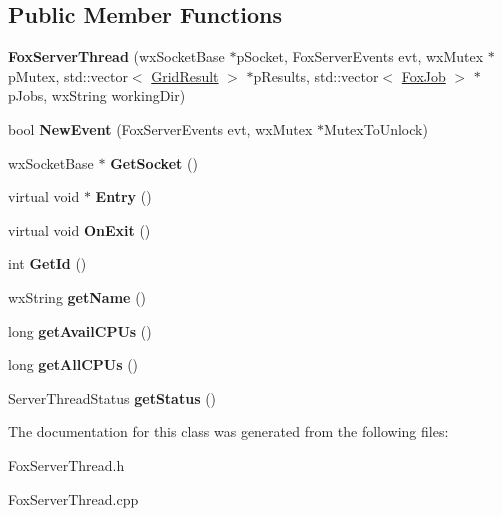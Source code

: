 \subsection*{Public Member Functions}
\begin{DoxyCompactItemize}
\item 
\mbox{\label{class_fox_server_thread_a2f5dd9031e5365799fbc0148aaf4924a}} 
{\bfseries Fox\+Server\+Thread} (wx\+Socket\+Base $\ast$p\+Socket, Fox\+Server\+Events evt, wx\+Mutex $\ast$p\+Mutex, std\+::vector$<$ \mbox{\hyperlink{class_grid_result}{Grid\+Result}} $>$ $\ast$p\+Results, std\+::vector$<$ \mbox{\hyperlink{class_fox_job}{Fox\+Job}} $>$ $\ast$p\+Jobs, wx\+String working\+Dir)
\item 
\mbox{\label{class_fox_server_thread_a75f635286768973b908cc084d428f711}} 
bool {\bfseries New\+Event} (Fox\+Server\+Events evt, wx\+Mutex $\ast$Mutex\+To\+Unlock)
\item 
\mbox{\label{class_fox_server_thread_a57cf46c3bce5b7211c999fdda939127a}} 
wx\+Socket\+Base $\ast$ {\bfseries Get\+Socket} ()
\item 
\mbox{\label{class_fox_server_thread_a2e98a4e466bf9c763a125796e388eda4}} 
virtual void $\ast$ {\bfseries Entry} ()
\item 
\mbox{\label{class_fox_server_thread_a8052f104473507f143c635e43a7ec860}} 
virtual void {\bfseries On\+Exit} ()
\item 
\mbox{\label{class_fox_server_thread_aed57a002d85d276e37f57427d38e5a61}} 
int {\bfseries Get\+Id} ()
\item 
\mbox{\label{class_fox_server_thread_ae204e50610a8352f6dc2a061ec96c0d9}} 
wx\+String {\bfseries get\+Name} ()
\item 
\mbox{\label{class_fox_server_thread_a11191529b2d7cbd886ad91c4fa50f512}} 
long {\bfseries get\+Avail\+C\+P\+Us} ()
\item 
\mbox{\label{class_fox_server_thread_aff2e868a51c26bec12d5296b1c213394}} 
long {\bfseries get\+All\+C\+P\+Us} ()
\item 
\mbox{\label{class_fox_server_thread_ab2a87ee26ac579833c8d03cb975b5a4d}} 
Server\+Thread\+Status {\bfseries get\+Status} ()
\end{DoxyCompactItemize}


The documentation for this class was generated from the following files\+:\begin{DoxyCompactItemize}
\item 
Fox\+Server\+Thread.\+h\item 
Fox\+Server\+Thread.\+cpp\end{DoxyCompactItemize}
